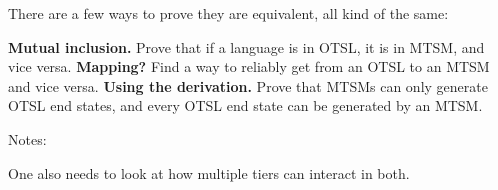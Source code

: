 
There are a few ways to prove they are equivalent, all kind of the same:

\pex \a \textbf{Mutual inclusion.} Prove that if a language is in OTSL, it is in MTSM, and vice versa.
    \a \textbf{Mapping?} Find a way to reliably get from an OTSL to an MTSM and vice versa.
    \a \textbf{Using the derivation.} Prove that MTSMs can only generate OTSL end states, and every OTSL end state can be generated by an MTSM.
\xe

Notes:

\pex \a One also needs to look at how multiple tiers can interact in both.
\xe
